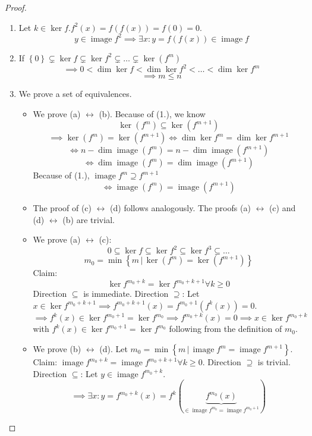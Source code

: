 \documentclass{article}
\newcommand{\set}[1]{\left\{#1\right\}}
\newcommand{\setdef}[2]{\left\{\left.#1\,\right|\,#2\right\}}
\DeclareMathOperator{\im}{image}
\begin{document}
\begin{proof}
  \begin{enumerate}
    \item Let $k \in \ker{f}. f^2(x) = f(f(x)) = f(0) = 0$.
      \[ y \in \im{f^2} \implies \exists x: y = f(f(x)) \in \im{f} \]
    \item If $\set{0} \subsetneq \ker{f} \subsetneq \ker{f^2} \subsetneq \dots \subsetneq \ker(f^m)$
      \[ \implies 0 < \dim{\ker{f}} < \dim{\ker{f^2}} < \dots < \dim{\ker{f^m}} \]
      \[ \implies m \leq n \]
    \item We prove a set of equivalences.
      \begin{itemize}
        \item 
          We prove (a) $\leftrightarrow$ (b).
          Because of (1.), we know
          \[ \ker(f^m) \subseteq \ker(f^{m+1}) \]
          \[ \implies \ker(f^m) = \ker(f^{m+1}) \iff \dim\ker{f^m} = \dim\ker{f^{m+1}} \]
          \[ \iff n - \dim\im(f^m) = n - \dim\im(f^{m+1}) \]
          \[ \iff \dim\im(f^m) = \dim\im(f^{m+1}) \]
          Because of (1.), $\im{f^m} \supseteq f^{m+1}$
          \[ \iff \im(f^m) = \im(f^{m+1}) \]
        \item
          The proof of (c) $\leftrightarrow$ (d) follows analogously.
          The proofs (a) $\leftrightarrow$ (c) and (d) $\leftrightarrow$ (b) are trivial.
        \item
          We prove (a) $\leftrightarrow$ (c):
          \[ 0 \subseteq \ker{f} \subseteq \ker{f^2} \subseteq \ker{f^3} \subseteq \dots \]
          \[ m_0 = \min\setdef{m}{\ker(f^m) = \ker(f^{m+1})} \]
          Claim:
          \[ \ker{f^{m_0 + k}} = \ker{f^{m_0 + k + 1}} \forall k \geq 0 \]
          Direction $\subseteq$ is immediate.
          Direction $\supseteq$: Let $x \in \ker{f^{m_0 + k + 1}} \implies f^{m_0 + k + 1}(x) = f^{m_0 + 1}(f^k(x)) = 0$.
          \[ \implies f^k(x) \in \ker{f^{m_0 + 1}} = \ker{f^{m_0}} \implies f^{m_0 + k}(x) = 0 \implies x \in \ker{f^{m_0 + k}} \]
          with $f^k(x) \in \ker{f^{m_0 + 1}} = \ker{f^{m_0}}$ following from the definition of $m_0$.
        \item
          We prove (b) $\leftrightarrow$ (d).
          Let $m_0 = \min\setdef{m}{\im{f^m} = \im{f^{m+1}}}$.
          Claim: $\im{f^{m_0 + k}} = \im{f^{m_0 + k + 1}} \forall k \geq 0$.
          Direction $\supseteq$ is trivial.
          Direction $\subseteq$:
          Let $y \in \im{f^{m_0 + k}}$.
          \[ \implies \exists x: y = f^{m_0 + k}(x) = f^k(\underbrace{f^{m_0}(x)}_{\in \im{f^{m_0} = \im{f^{m_0 + 1}}}}) \]

\end{itemize}
\end{enumerate}
\end{proof}
\end{document}
